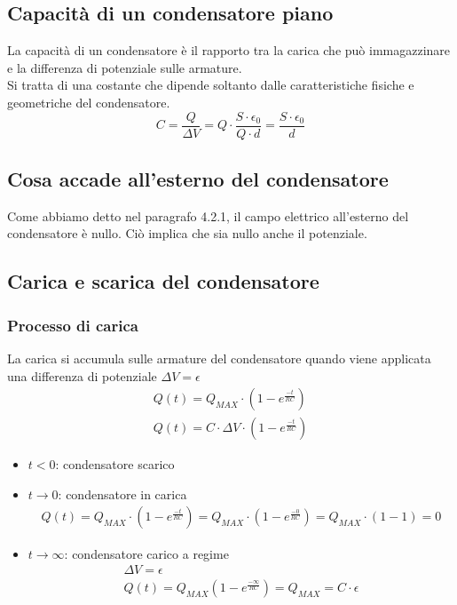 \subsection{Capacità di un condensatore piano}
La capacità di un condensatore è il rapporto tra la carica che può immagazzinare e la differenza di potenziale sulle armature.\\
Si tratta di una costante che dipende soltanto dalle caratteristiche fisiche e geometriche del condensatore.
\begin{displaymath}
	C = \frac{Q}{\Delta V} = Q \cdot \frac{S \cdot \epsilon_0}{Q \cdot d} = \frac{S \cdot \epsilon_0}{d} 
\end{displaymath}

\subsection{Cosa accade all'esterno del condensatore}
Come abbiamo detto nel paragrafo 4.2.1, il campo elettrico all'esterno del condensatore è nullo. Ciò implica che sia nullo anche il potenziale.

\subsection{Carica e scarica del condensatore}
\subsubsection{Processo di carica}
La carica si accumula sulle armature del condensatore quando viene applicata una differenza di potenziale $\Delta V = \epsilon$
\begin{displaymath}\begin{aligned}
	Q(t) = Q_{MAX} \cdot (1- e^{\frac{-t}{RC}})\\
    Q(t) = C \cdot \Delta V \cdot (1- e^{\frac{-t}{RC}})
\end{aligned}\end{displaymath}
\begin{itemize}
	\item{$t < 0$: condensatore scarico}
    \item{$t \rightarrow 0$: condensatore in carica 
    	\begin{displaymath}\begin{aligned}
            Q(t) = Q_{MAX} \cdot (1- e^{\frac{-t}{RC}}) = 
            Q_{MAX} \cdot (1- e^{\frac{-0}{RC}}) = 
            Q_{MAX} \cdot (1- 1) = 0
    	\end{aligned}\end{displaymath}}
    \item{$t \rightarrow \infty$: condensatore carico a regime
      \begin{displaymath}\begin{aligned}
              \Delta V = \epsilon\\
              Q(t) = Q_{MAX} (1- e^{\frac{-\infty}{RC}}) = 
              Q_{MAX} = C \cdot \epsilon
          \end{aligned}\end{displaymath}}
\end{itemize}

